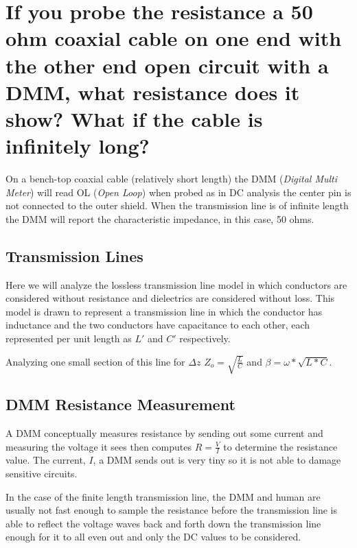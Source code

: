 \documentclass[main.tex]{subfiles}
\begin{document}
\section{If you probe the resistance a 50 ohm coaxial cable on one end with the other end open circuit with a DMM, what resistance does it show? What if the cable is infinitely long?}

\spoilerline


\noindent On a bench-top coaxial cable (relatively short length) the DMM (\textit{Digital Multi Meter}) will read OL (\textit{Open Loop}) when probed as in DC analysis the center pin is not connected to the outer shield. When the transmission line is of infinite length the DMM will report the characteristic impedance, in this case, 50 ohms.

\subsection{Transmission Lines}
Here we will analyze the lossless transmission line model in which conductors are considered without resistance and dielectrics are considered without loss. This model is drawn to represent a transmission line in which the conductor has inductance and the two conductors have capacitance to each other, each represented per unit length as $L\prime$ and $C\prime$ respectively.


Analyzing one small section of this line for $\Delta z$ 
$Z_o = \sqrt{\frac{L}{C}}$ and $\beta = \omega * \sqrt{L*C}$.

\subsection{DMM Resistance Measurement}
A DMM conceptually measures resistance by sending out some current and measuring the voltage it sees then computes $R = \frac{V}{I}$ to determine the resistance value. The current, $I$, a DMM sends out is very tiny so it is not able to damage sensitive circuits. 

In the case of the finite length transmission line, the DMM and human are usually not fast enough to sample the resistance before the transmission line is able to reflect the voltage waves back and forth down the transmission line enough for it to all even out and only the DC values to be considered.
\end{document}
